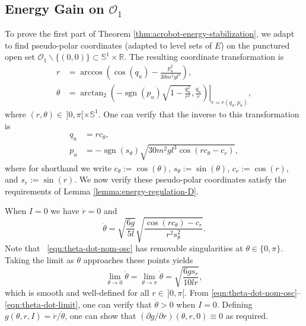 \documentclass[journal,twoside,web, twocolumn,draftcls]{ieeecolor}
\DeclareMathOperator{\Sign}{sgn}
\newcommand*{\sign}[1]{\Sign\left(#1\right)}
\newcommand*{\R}{\mathbb{R}}
\newcommand*{\Sone}{\mathbb{S}^1}
\newcommand*{\SxR}{\Sone \times \R}
\begin{document}
\subsection{Energy Gain on \(\mathcal{O}_1\)}\label{sec:proof-o1}
To prove the first part of Theorem
\ref{thm:acrobot-energy-stabilization}, we adapt
\cite[Eqn. (9)]{dynamic_vhcs_stabilize_closed_orbits} to find 
pseudo-polar coordinates (adapted to level sets of \(E\)) on
the punctured open set \(\mathcal{O}_1 \backslash \{(0,0)\} \subset \SxR\).
The resulting coordinate transformation is
\begin{align}
    \label{eqn:r-osc}
    r &= \arccos\left(\cos(q_u) - \frac{p_u^2}{30m^2gl^3}\right)
    , \\
    \label{eqn:theta-osc}
    \theta &=
    \left.\arctan_2\left(-\sign{p_u}\sqrt{1-\frac{q_u^2}{r^2}},\frac{q_u}{r}\right)
    \right|_{r = r(q_u,p_u)}
    ,
\end{align}
where \((r,\theta) \in \, ]0,\pi[ \times \Sone\).
One can verify that the inverse to this transformation is
\begin{align*}
    q_u &= rc_\theta
    , \\
    p_u &= -\sign{s_\theta}
    \sqrt{30m^2gl^3\cos(rc_\theta - c_r)}
    ,
\end{align*}
where for shorthand we write \(c_\theta := \cos(\theta)\), \(s_\theta :=
\sin(\theta)\), \(c_r := \cos(r)\), and \(s_r := \sin(r)\).
We now verify these pseudo-polar coordinates satisfy the requirements of 
Lemma \ref{lemma:energy-regulation-D}.

When \(I = 0\) we have \(\dot{r} = 0\) and
\begin{equation} \label{eqn:theta-dot-nom-osc}
    \dot{\theta} = \sqrt{\frac{6g}{5l}} 
        \sqrt{\frac{\cos(r c_\theta) - c_r}
            {r^2 s_\theta^2}}
    .
\end{equation}
Note that ~\eqref{eqn:theta-dot-nom-osc} has removable singularities at
\(\theta \in \{0,\pi\}\).
Taking the limit as \(\theta\) approaches these points yields
\begin{equation}\label{eqn:theta-dot-limit}
    \lim\limits_{\theta \to 0}\dot{\theta} 
    = \lim\limits_{\theta \to \pi} \dot{\theta}
    = \sqrt{\frac{6g s_r}{10lr}}
    , 
\end{equation}
which is smooth and well-defined for all
\(r \in \, ]0,\pi[\).
From \eqref{eqn:theta-dot-nom-osc}--\eqref{eqn:theta-dot-limit},
one can verify that \(\dot{\theta} > 0\) when \(I = 0\).
Defining \(g(\theta,r,I) = \dot{r}/\dot{\theta}\), one can show that
\((\partial g/\partial r)(\theta,r,0) \equiv 0\) as required.
\end{document}
